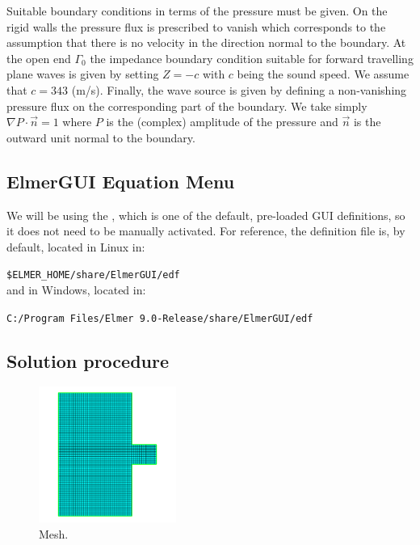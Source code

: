Suitable boundary conditions in terms of the pressure must be given. On the rigid walls the pressure flux is prescribed to vanish which corresponds to the assumption that there is no velocity in the direction normal to the boundary. At the open end $\Gamma_0$ the impedance boundary condition suitable for forward travelling plane waves is given by setting $Z=-c$ with $c$ being the sound speed. We assume that $c=343$ (m/s). Finally, the wave source is given by defining a non-vanishing pressure flux on the corresponding part of the boundary. We take simply $\nabla P \cdot \vec n = 1$ where $P$ is the (complex) amplitude of the pressure and $\vec n$ is the outward unit normal to the boundary. 

\subsection*{ElmerGUI Equation Menu}

We will be using the , which is one of the default, pre-loaded GUI definitions, so it does not need to be manually activated.  For reference, the  \texttt{} definition file is, by default, located in Linux in:

\texttt{\$ELMER\_HOME/share/ElmerGUI/edf}\\

and in Windows, located in:

\texttt{C:/Program Files/Elmer 9.0-Release/share/ElmerGUI/edf}\\

\subsection*{Solution procedure}

\begin{figure}
\centering
\includegraphics[width=0.4\textwidth]{mesh}
\caption{Mesh.}\label{fg:mesh}
\end{figure}


